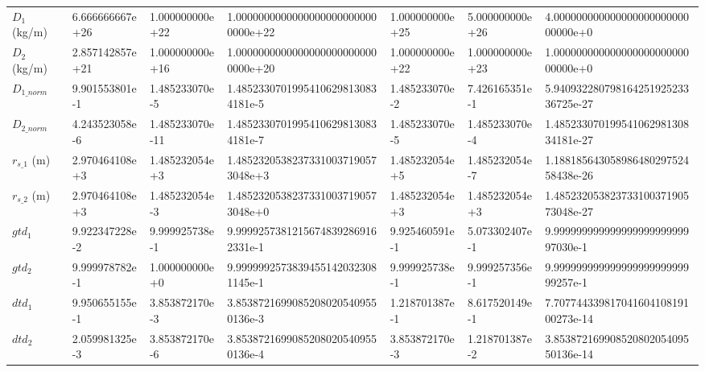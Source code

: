 \begin{table}[ht]
\begin{tabular}{@{} l l l l l l l @{}}
$D_1$ (kg/m) & {\ttfamily 6.666666667e+26} & {\ttfamily 1.000000000e+22} & {\ttfamily 1.00000000000000000000000000000e+22} & {\ttfamily 1.000000000e+25} & {\ttfamily 5.000000000e+26} & {\ttfamily 4.00000000000000000000000000000e+0} \\
$D_2$ (kg/m) & {\ttfamily 2.857142857e+21} & {\ttfamily 1.000000000e+16} & {\ttfamily 1.00000000000000000000000000000e+20} & {\ttfamily 1.000000000e+22} & {\ttfamily 1.000000000e+23} & {\ttfamily 1.00000000000000000000000000000e+0} \\
$D_{1\_norm}$ & {\ttfamily 9.901553801e-1} & {\ttfamily 1.485233070e-5} & {\ttfamily 1.48523307019954106298130834181e-5} & {\ttfamily 1.485233070e-2} & {\ttfamily 7.426165351e-1} & {\ttfamily 5.94093228079816425192523336725e-27} \\
$D_{2\_norm}$ & {\ttfamily 4.243523058e-6} & {\ttfamily 1.485233070e-11} & {\ttfamily 1.48523307019954106298130834181e-7} & {\ttfamily 1.485233070e-5} & {\ttfamily 1.485233070e-4} & {\ttfamily 1.48523307019954106298130834181e-27} \\
$r_{s\_1}$ (m) & {\ttfamily 2.970464108e+3} & {\ttfamily 1.485232054e+3} & {\ttfamily 1.48523205382373310037190573048e+3} & {\ttfamily 1.485232054e+5} & {\ttfamily 1.485232054e-7} & {\ttfamily 1.18818564305898648029752458438e-26} \\
$r_{s\_2}$ (m) & {\ttfamily 2.970464108e+3} & {\ttfamily 1.485232054e-3} & {\ttfamily 1.48523205382373310037190573048e+0} & {\ttfamily 1.485232054e+3} & {\ttfamily 1.485232054e+3} & {\ttfamily 1.48523205382373310037190573048e-27} \\
$gtd_1$ & {\ttfamily 9.922347228e-2} & {\ttfamily 9.999925738e-1} & {\ttfamily 9.99992573812156748392869162331e-1} & {\ttfamily 9.925460591e-1} & {\ttfamily 5.073302407e-1} & {\ttfamily 9.99999999999999999999999997030e-1} \\
$gtd_2$ & {\ttfamily 9.999978782e-1} & {\ttfamily 1.000000000e+0} & {\ttfamily 9.99999925738394551420323081145e-1} & {\ttfamily 9.999925738e-1} & {\ttfamily 9.999257356e-1} & {\ttfamily 9.99999999999999999999999999257e-1} \\
$dtd_1$ & {\ttfamily 9.950655155e-1} & {\ttfamily 3.853872170e-3} & {\ttfamily 3.85387216990852080205409550136e-3} & {\ttfamily 1.218701387e-1} & {\ttfamily 8.617520149e-1} & {\ttfamily 7.70774433981704160410819100273e-14} \\
$dtd_2$ & {\ttfamily 2.059981325e-3} & {\ttfamily 3.853872170e-6} & {\ttfamily 3.85387216990852080205409550136e-4} & {\ttfamily 3.853872170e-3} & {\ttfamily 1.218701387e-2} & {\ttfamily 3.85387216990852080205409550136e-14} \\
\bottomrule
\end{tabular}
\end{table}

